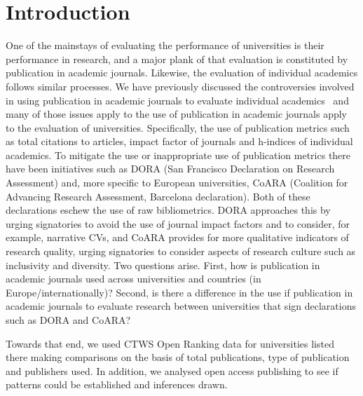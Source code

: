 \documentclass[amsfonts, amssymb, prl, superscriptaddress, notitlepage, twocolumn, nofootinbib]{revtex4-2}
\begin{document}
\maketitle 

\section{Introduction}
One of the mainstays of evaluating the performance of universities is their performance in research, and a major plank of that evaluation is constituted by publication in academic journals. Likewise, the evaluation of individual academics follows similar processes. 
We have previously discussed the controversies involved in using publication in academic journals to evaluate individual academics~\cite{watson2023assessing} and many of those issues apply to the use of publication in academic journals apply to the evaluation of universities. Specifically, the use of publication metrics such as total citations to articles, impact factor of journals and h-indices of individual academics. 
To mitigate the use or inappropriate use of publication metrics there have been initiatives such as DORA (San Francisco Declaration on Research Assessment) and, more specific to European universities, CoARA (Coalition for Advancing Research Assessment, Barcelona declaration). Both of these declarations eschew the use of raw bibliometrics. DORA approaches this by urging signatories to avoid the use of journal impact factors and to consider, for example, narrative CVs, and CoARA provides for more qualitative indicators of research quality, urging signatories to consider aspects of research culture such as inclusivity and diversity. 
Two questions arise. First, how is publication in academic journals used across universities and countries (in Europe/internationally)? Second, is there a difference in the use if publication in academic journals to evaluate research between universities that sign declarations such as DORA and CoARA? 

Towards that end, we used CTWS Open Ranking data for universities listed there making comparisons on the basis of total publications, type of publication and publishers used. In addition, we analysed open access publishing to see if patterns could be established and inferences drawn.
\end{document}
